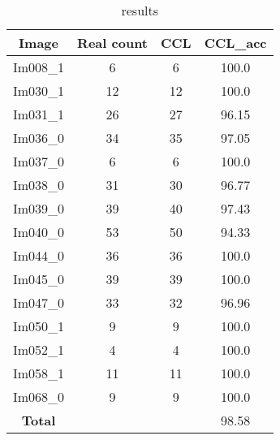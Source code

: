 \begin{table}[H]
\centering
\begin{tabular}{|  c | c | c | c |}
\hline
\textbf{Image} & \textbf{Real count} & \textbf{CCL} & \textbf{CCL\_acc} \\
\hline
Im008\_1 & 6 & 6  & 100.0 \\
Im030\_1 & 12 & 12  & 100.0 \\
Im031\_1 & 26 & 27  & 96.15 \\
Im036\_0 & 34 & 35  & 97.05 \\
Im037\_0 & 6 & 6  & 100.0 \\
Im038\_0 & 31 & 30  & 96.77 \\
Im039\_0 & 39 & 40  & 97.43 \\
Im040\_0 & 53 & 50  & 94.33 \\
Im044\_0 & 36 & 36  & 100.0 \\
Im045\_0 & 39 & 39  & 100.0 \\
Im047\_0 & 33 & 32  & 96.96 \\
Im050\_1 & 9 & 9  & 100.0 \\
Im052\_1 & 4 & 4  & 100.0 \\
Im058\_1 & 11 & 11  & 100.0 \\
Im068\_0 & 9 & 9  & 100.0 \\
\hline
\textbf{Total} &  &  & 98.58\\
\hline
\end{tabular}
\caption{results}
\label{table:result}
\end{table}